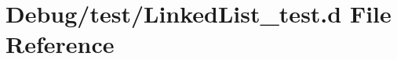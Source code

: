 \hypertarget{_linked_list__test_8d}{}\section{Debug/test/\+Linked\+List\+\_\+test.d File Reference}
\label{_linked_list__test_8d}
